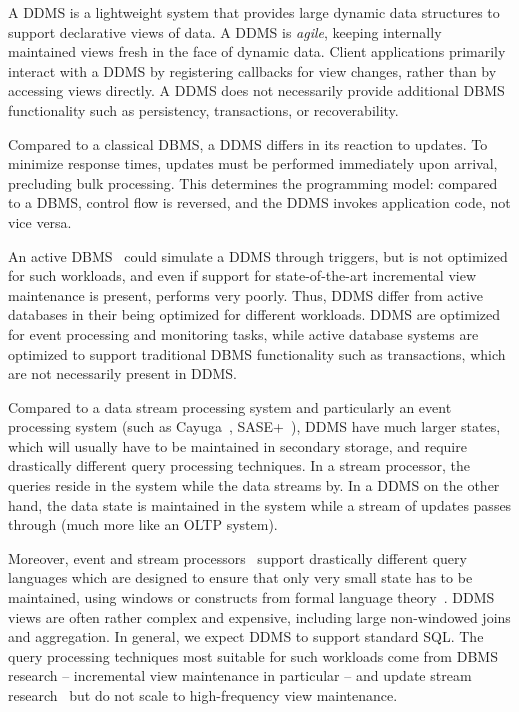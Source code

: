 \noindent A DDMS is a lightweight system that provides large dynamic data
structures to support declarative views of data. A DDMS is \textit{agile},
keeping internally maintained views fresh in the face of dynamic data.  Client
applications primarily interact with a DDMS by registering callbacks for view
changes, rather than by accessing views directly. A DDMS does not necessarily
provide additional DBMS functionality such as persistency, transactions, or
recoverability.





Compared to a classical DBMS, a DDMS differs in its reaction to updates.  To
minimize response times, updates must be performed immediately upon arrival,
precluding bulk processing. This determines the programming model: compared to
a DBMS, control flow is reversed, and the DDMS invokes application code, not
vice versa.

An active DBMS~\cite{ceri-vldb:00} could simulate a DDMS through triggers, but
is not optimized for such workloads, and even if support for state-of-the-art
incremental view maintenance is present, performs very poorly. Thus, DDMS differ
from active databases in their being optimized for different workloads. DDMS are
optimized for event processing and monitoring tasks, while active database
systems are optimized to support traditional DBMS functionality such as
transactions, which are not necessarily present in DDMS.


Compared to a data stream processing system and particularly an event processing
system (such as Cayuga~\cite{demers-sigmod:07}, SASE+~\cite{agrawal-sigmod:08}),
DDMS have much larger states, which will usually have to be maintained in
secondary storage, and require drastically different query processing
techniques. In a stream processor, the queries reside in the system while the
data streams by. In a DDMS on the other hand, the data state is maintained in
the system while a stream of updates passes through (much more like an OLTP
system).

%
Moreover, event and stream processors~\cite{abadi-vldbj:03, motwani-cidr:03,
chandrasekaran-cidr:03} support drastically different query languages which are
designed to ensure that only very small state has to be maintained, using
windows or constructs from formal language theory~\cite{white-pods:07}. DDMS
views are often rather complex and expensive, including large non-windowed joins
and aggregation. In general, we expect DDMS to support standard SQL.
The query processing techniques most suitable for such workloads come from DBMS
research -- incremental view maintenance in particular -- and update stream
research~\cite{ghanem-tods:10} but do not scale to high-frequency view
maintenance.


